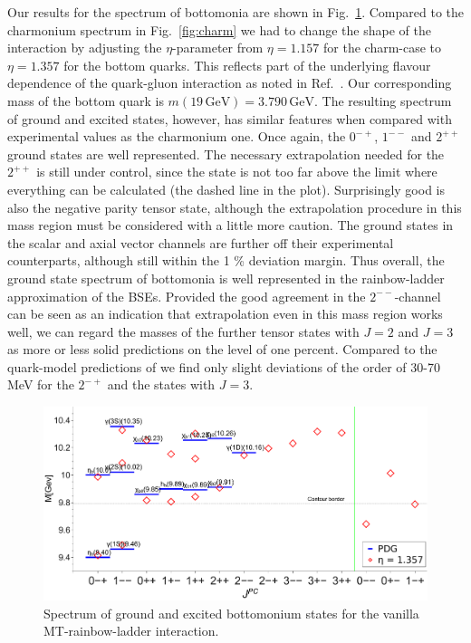 Our results for the spectrum of bottomonia are shown in Fig.~\ref{fig:bottom}. Compared to
the charmonium spectrum in Fig.~\ref{fig:charm} we had to change the shape of the interaction
by adjusting the $\eta$-parameter from $\eta=1.157$ for the charm-case to $\eta=1.357$ 
for the bottom quarks. This reflects part of the underlying flavour dependence of the quark-gluon 
interaction as noted in Ref.~\cite{Williams:2014iea}. Our corresponding mass of the bottom quark
is $m(19 \,\mbox{GeV})=3.790 \,\mbox{GeV}$. The resulting spectrum of ground and excited states, 
however, has similar features when compared with experimental values as the charmonium one. 
Once again, the $0^{-+}$, $1^{--}$ and $2^{++}$ ground states are well represented. The necessary
extrapolation needed for the $2^{++}$ is still under control, since the state is not too far above
the limit where everything can be calculated (the dashed line in the plot). Surprisingly good is
also the negative parity tensor state, although the extrapolation procedure in this
mass region must be considered with a little more caution. The ground states
in the scalar and axial vector channels are further off their experimental counterparts,
although still within the 1 \% deviation margin. Thus overall, the ground state spectrum
of bottomonia is well represented in the rainbow-ladder approximation of the BSEs.
Provided the good agreement in the $2^{--}$-channel can be seen as an indication that 
extrapolation even in this mass region works well, we can regard the masses of the 
further tensor states with $J=2$ and $J=3$ as more or less solid predictions 
on the level of one percent. Compared to the quark-model predictions of \cite{Ebert:2011jc}
we find only slight deviations of the order of 30-70 MeV for the $2^{-+}$ and the states 
with $J=3$.
%
\begin{figure}[h]
  \begin{center}
    \includegraphics[width=0.999\textwidth]{figures/spectrum_bb}
    \caption{Spectrum of ground and excited bottomonium states for the vanilla MT-rainbow-ladder interaction.}\label{fig:bottom}
  \end{center}
\end{figure}
